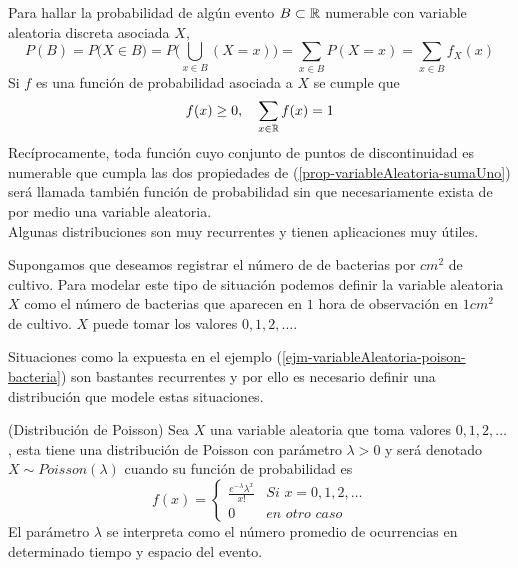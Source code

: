 Para hallar la probabilidad de algún evento $B\subset{\mathbb{R}}$ numerable con variable aleatoria discreta asociada $X$,
$$P(B)=P\big(X\in B)=P\big(\bigcup_{x\in B}(X=x)\big)=\sum_{x\in B}P(X=x)=\sum_{x\in B}f_X(x)$$
Si $f$ es una función de probabilidad asociada a $X$ se cumple que 
\begin{eqnarray}
    f(x)\geq 0,\quad\sum_{x\in {\mathbb{R}}}f(x)=1 \label{prop-variableAleatoria-sumaUno}
\end{eqnarray}
Recíprocamente, toda función cuyo conjunto de puntos de discontinuidad es numerable que cumpla las dos propiedades de (\ref{prop-variableAleatoria-sumaUno}) será llamada también función de probabilidad sin que necesariamente exista de por medio una variable aleatoria.\\
Algunas distribuciones son muy recurrentes y tienen aplicaciones muy útiles.
\begin{Ejm}
\label{ejm-variableAleatoria-poison-bacteria}
    Supongamos que deseamos  registrar el número de de bacterias por $cm^2$ de cultivo. Para modelar este tipo de situación podemos definir la variable aleatoria $X$ como el número de bacterias que aparecen en $1$ hora de observación en $1 cm^2$ de cultivo. $X$ puede tomar los valores $0,1,2,\ldots$.
\end{Ejm}
Situaciones como la expuesta en el ejemplo  (\ref{ejm-variableAleatoria-poison-bacteria}) son bastantes recurrentes y por ello es necesario definir una distribución que modele estas situaciones.
\begin{Def}(Distribución de Poisson)
    Sea $X$ una variable aleatoria que toma valores $0,1,2,\ldots$ , esta tiene una distribución de Poisson con parámetro $\lambda>0$ y será denotado $X\sim Poisson(\lambda)$ cuando su función de probabilidad es
    $$f(x)=\begin{cases}\frac{e^{-\lambda}\lambda^x}{x!}& \textit{Si }x=0,1,2,\ldots\\
    0 &\textit{en otro caso}
    \end{cases}$$
    El parámetro $\lambda$ se interpreta como el número promedio de ocurrencias en determinado tiempo y espacio del evento.
\end{Def}

